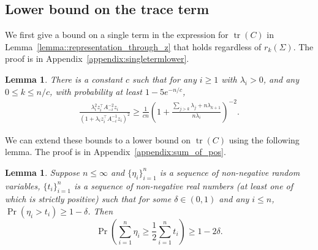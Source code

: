 \documentclass[11pt,notitlepage]{article}
\newcommand\tr {\ensuremath{\operatorname{\mathrm{tr}}}}
\newtheorem{lemma}[theorem]{Lemma}
\begin{document}
\subsection*{Lower bound on the trace term}

We first give a bound on a single term in the expression for $\tr(C)$
in Lemma~\ref{lemma::representation_through_z}
that holds regardless of $r_k(\Sigma)$. The proof is in
Appendix~\ref{appendix:singletermlower}.

\begin{lemma}\label{lemma:singletermlower}
  There is a constant $c$ such that for any  $i\ge 1$ with $\lambda_i > 0$, and any $0\le k\le n/c$, 
 with probability  at least 
$1-5e^{-n/c}$,
    \begin{align*}
      \frac{\lambda_i^2 z_i^\top A_{-i}^{-2}z_i}
          {(1 + \lambda_i z_i^\top A_{-i}^{-1}z_i)^2}  \ge 
   \frac{1}{cn} \left(1+\frac{\sum_{j >k} \lambda_j
          + n\lambda_{k+1}}{n\lambda_i}\right)^{-2}.
    \end{align*}
\end{lemma}

We can extend these bounds to a lower bound on $\tr(C)$
using the following lemma. The proof is in Appendix~\ref{appendix:sum_of_pos}.

\begin{lemma}\label{lemma::sum_of_pos}
  Suppose $n\leq \infty$ and $\{\eta_i\}_{i = 1}^n$ is a sequence
  of non-negative random variables, $\{t_i\}_{i=1}^n$ is a sequence
  of non-negative real numbers (at least one of which is strictly
  positive) such that for some $\delta \in (0,1)$ and any
  $i \leq n$, $\Pr(\eta_i > t_i) \geq 1 - \delta$. Then
    \[
      \Pr\left(\sum_{i=1}^n\eta_i \geq \frac12\sum_{i=1}^n t_i\right)
        \geq 1 - 2\delta.
    \]
\end{lemma}
\end{document}
